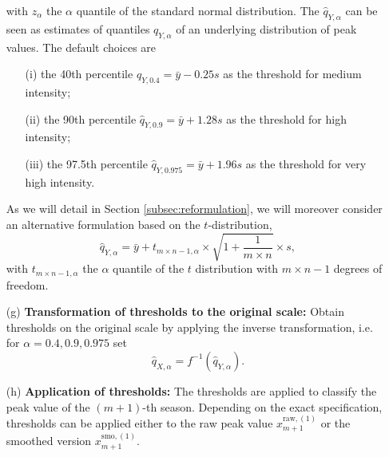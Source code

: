 \documentclass[12pt]{article}
\newcommand{\sd}{s}
\begin{document}
\begin{enumerate}
with $z_\alpha$ the $\alpha$ quantile of the standard normal distribution. The $\hat{q}_{Y, \alpha}$ can be seen as estimates of quantiles $q_{Y, \alpha}$ of an underlying distribution of peak values. The default choices are
\begin{itemize}
\item[(i)] the 40th percentile $\hat{q}_{Y, 0.4} = \bar{y} - 0.25 \sd$ as the threshold for medium intensity;
\item[(ii)] the 90th percentile $\hat{q}_{Y, 0.9} = \bar{y} + 1.28 \sd$ as the threshold for high intensity;
\item[(iii)] the 97.5th percentile $\hat{q}_{Y, 0.975} = \bar{y} + 1.96\sd$ as the threshold for very high intensity.
\end{itemize}
As we will detail in Section \ref{subsec:reformulation}, we will moreover consider an alternative formulation based on the $t$-distribution,
\begin{equation}
\hat{q}_{Y, \alpha} = \bar{y} + t_{m\times n - 1, \alpha} \times \sqrt{1 + \frac{1}{m\times n}} \times s,
\label{eq:q_Y_t}
\end{equation}
with $t_{m\times n - 1, \alpha}$ the $\alpha$ quantile of the $t$ distribution with $m\times n - 1$ degrees of freedom.
\item[(g)] \textbf{Transformation of thresholds to the original scale:} Obtain thresholds on the original scale by applying the inverse transformation, i.e. for $\alpha = 0.4, 0.9, 0.975$ set%
$$
\hat{q}_{X, \alpha} = f^{-1}(\hat{q}_{Y, \alpha}).
$$
\item[(h)] \textbf{Application of thresholds:} The thresholds are applied to classify the peak value of the $(m + 1)$-th season. Depending on the exact specification, thresholds can be applied either to the raw peak value $x_{m + 1}^{\text{raw}, (1)}$ or the smoothed version $x_{m + 1}^{\text{smo}, (1)}$.
\end{enumerate}
\end{document}
